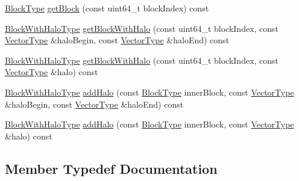 \begin{DoxyCompactItemize}
\item 
\hyperlink{classnifty_1_1tools_1_1Blocking_a597e0d4186d2d40ccb96698cc16775c6}{Block\+Type} \hyperlink{classnifty_1_1tools_1_1Blocking_ad5f32d8ff7c1c9b36035ad572ceee0be}{get\+Block} (const uint64\+\_\+t block\+Index) const
\item 
\hyperlink{classnifty_1_1tools_1_1Blocking_abebd9361d89cc399bc495861fa4e331d}{Block\+With\+Halo\+Type} \hyperlink{classnifty_1_1tools_1_1Blocking_aa295ddc729d0cfd5ac90d18573d96b26}{get\+Block\+With\+Halo} (const uint64\+\_\+t block\+Index, const \hyperlink{classnifty_1_1tools_1_1Blocking_a5f8df3d4cdf09803217d729a04018fb3}{Vector\+Type} \&halo\+Begin, const \hyperlink{classnifty_1_1tools_1_1Blocking_a5f8df3d4cdf09803217d729a04018fb3}{Vector\+Type} \&halo\+End) const
\item 
\hyperlink{classnifty_1_1tools_1_1Blocking_abebd9361d89cc399bc495861fa4e331d}{Block\+With\+Halo\+Type} \hyperlink{classnifty_1_1tools_1_1Blocking_aeeb540a2fe69cd5f3e89047daa922f13}{get\+Block\+With\+Halo} (const uint64\+\_\+t block\+Index, const \hyperlink{classnifty_1_1tools_1_1Blocking_a5f8df3d4cdf09803217d729a04018fb3}{Vector\+Type} \&halo) const
\item 
\hyperlink{classnifty_1_1tools_1_1Blocking_abebd9361d89cc399bc495861fa4e331d}{Block\+With\+Halo\+Type} \hyperlink{classnifty_1_1tools_1_1Blocking_a09126c498d87974b9cabcae18c887b4f}{add\+Halo} (const \hyperlink{classnifty_1_1tools_1_1Blocking_a597e0d4186d2d40ccb96698cc16775c6}{Block\+Type} inner\+Block, const \hyperlink{classnifty_1_1tools_1_1Blocking_a5f8df3d4cdf09803217d729a04018fb3}{Vector\+Type} \&halo\+Begin, const \hyperlink{classnifty_1_1tools_1_1Blocking_a5f8df3d4cdf09803217d729a04018fb3}{Vector\+Type} \&halo\+End) const
\item 
\hyperlink{classnifty_1_1tools_1_1Blocking_abebd9361d89cc399bc495861fa4e331d}{Block\+With\+Halo\+Type} \hyperlink{classnifty_1_1tools_1_1Blocking_a735ce675927a0a76cf9370c40022e8de}{add\+Halo} (const \hyperlink{classnifty_1_1tools_1_1Blocking_a597e0d4186d2d40ccb96698cc16775c6}{Block\+Type} inner\+Block, const \hyperlink{classnifty_1_1tools_1_1Blocking_a5f8df3d4cdf09803217d729a04018fb3}{Vector\+Type} \&halo) const
\end{DoxyCompactItemize}


\subsection{Member Typedef Documentation}
\mbox{\label{classnifty_1_1tools_1_1Blocking_a597e0d4186d2d40ccb96698cc16775c6}} 
